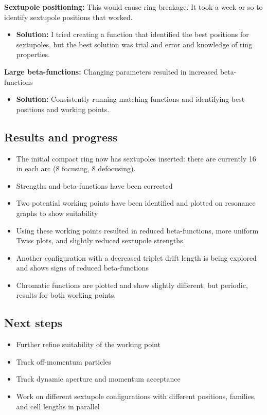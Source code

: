 \documentclass{article}
\begin{document}
\textbf{Sextupole positioning:} This would cause ring breakage. It took a week or so to identify sextupole positions that worked.
\begin{itemize}
    \item \textbf{Solution:} I tried creating a function that identified the best positions for sextupoles, but the best solution was trial and error and knowledge of ring properties.
\end{itemize}

\textbf{Large beta-functions:} Changing parameters resulted in increased beta-functions
\begin{itemize}
    \item \textbf{Solution:} Consistently running matching functions and identifying best positions and working points.
\end{itemize}

\subsection{Results and progress}
\begin{itemize}
    \item The initial compact ring now has sextupoles inserted: there are currently 16 in each arc (8 focusing, 8 defocusing).
    \item Strengths and beta-functions have been corrected
    \item Two potential working points have been identified and plotted on resonance graphs to show suitability
    \item Using these working points resulted in reduced beta-functions, more uniform Twiss plots, and slightly reduced sextupole strengths.
    \item Another configuration with a decreased triplet drift length is being explored and shows signs of reduced beta-functions
    \item Chromatic functions are plotted and show slightly different, but periodic, results for both working points.
\end{itemize}

\subsection{Next steps}
\begin{itemize}
    \item Further refine suitability of the working point
    \item Track off-momentum particles
    \item Track dynamic aperture and momentum acceptance
    \item Work on different sextupole configurations with different positions, families, and cell lengths in parallel
\end{itemize}
\end{document}
